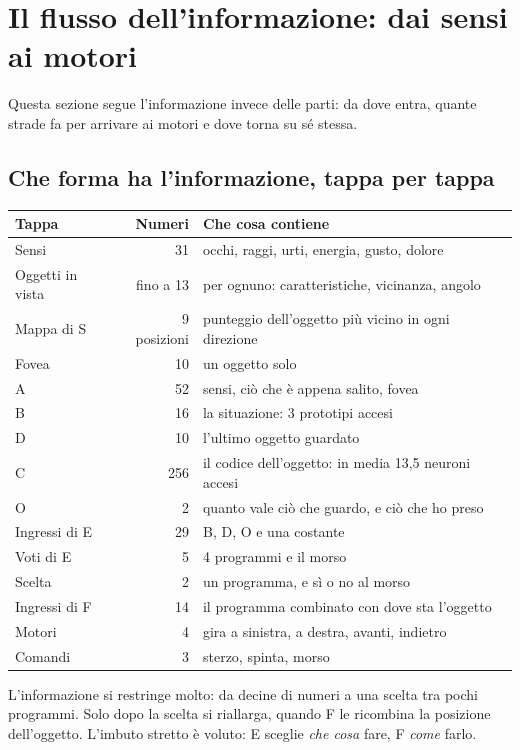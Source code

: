 \documentclass[11pt,a4paper]{article}
\begin{document}
\section{Il flusso dell'informazione: dai sensi ai motori}\label{sec:flusso}

Questa sezione segue l'informazione invece delle parti: da dove entra, quante strade fa
per arrivare ai motori e dove torna su sé stessa.

\subsection{Che forma ha l'informazione, tappa per tappa}

\begin{center}
\small
\begin{tabularx}{\textwidth}{@{}lrY@{}}
\toprule
\textbf{Tappa} & \textbf{Numeri} & \textbf{Che cosa contiene} \\
\midrule
Sensi & 31 & occhi, raggi, urti, energia, gusto, dolore \\
Oggetti in vista & fino a 13 & per ognuno: caratteristiche, vicinanza, angolo \\
Mappa di S & 9 posizioni & punteggio dell'oggetto più vicino in ogni direzione \\
Fovea & 10 & un oggetto solo \\
A & 52 & sensi, ciò che è appena salito, fovea \\
B & 16 & la situazione: 3 prototipi accesi \\
D & 10 & l'ultimo oggetto guardato \\
C & 256 & il codice dell'oggetto: in media 13,5 neuroni accesi \\
O & 2 & quanto vale ciò che guardo, e ciò che ho preso \\
Ingressi di E & 29 & B, D, O e una costante \\
Voti di E & 5 & 4 programmi e il morso \\
Scelta & 2 & un programma, e sì o no al morso \\
Ingressi di F & 14 & il programma combinato con dove sta l'oggetto \\
Motori & 4 & gira a sinistra, a destra, avanti, indietro \\
Comandi & 3 & sterzo, spinta, morso \\
\bottomrule
\end{tabularx}
\end{center}

L'informazione si restringe molto: da decine di numeri a una scelta tra pochi programmi.
Solo dopo la scelta si riallarga, quando F le ricombina la posizione dell'oggetto.
L'imbuto stretto è voluto: E sceglie \emph{che cosa} fare, F \emph{come} farlo.
\end{document}
